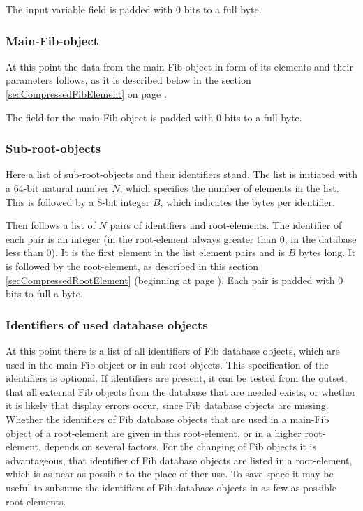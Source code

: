 The input variable field is padded with 0 bits to a full byte.


\subsubsection{Main-Fib-object}
\label{secCompressedRootMainObject}

At this point the data from the main-Fib-object in form of its elements and their parameters follows, as it is described below in the section \ref{secCompressedFibElement} on page \pageref{secCompressedFibElement} .

The field for the main-Fib-object is padded with 0 bits to a full byte.


\subsubsection{Sub-root-objects}
\label{secCompressedRootSubRoot}

Here a list of sub-root-objects and their identifiers stand. The list is initiated with a 64-bit natural number $N$, which specifies the number of elements in the list. This is followed by a 8-bit integer $B$, which indicates the bytes per identifier.

Then follows a list of $N$ pairs of identifiers and root-elements. The identifier of each pair is an integer (in the root-element always greater than 0, in the database less than 0). It is the first element in the list element pairs and is $B$ bytes long. It is followed by the root-element, as described in this section \ref{secCompressedRootElement} (beginning at page \pageref{secCompressedRootElement}). Each pair is padded with 0 bits to full a byte.


\subsubsection{Identifiers of used database objects}
\label{secCompressedRootDBIdentifier}

At this point there is a list of all identifiers of Fib database objects, which are used in the main-Fib-object or in sub-root-objects. This specification of the identifiers is optional. If identifiers are present, it can be tested from the outset, that all external Fib objects from the database that are needed exists, or whether it is likely that display errors occur, since Fib database objects are missing. Whether the identifiers of Fib database objects that are used in a main-Fib object of a root-element are given in this root-element, or in a higher root-element, depends on several factors. For the changing of Fib objects it is advantageous, that identifier of Fib database objects are listed in a root-element, which is as near as possible to the place of ther use. To save space it may be useful to subsume the identifiers of Fib database objects in as few as possible root-elements.

